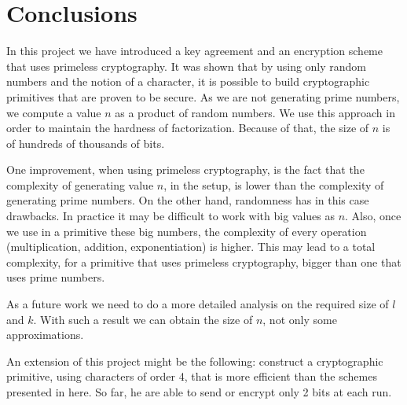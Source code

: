 \documentclass[11pt, a4paper, twoside, openright]{report}
\begin{document}
\clearpage

	\section{Conclusions}
	
		In this project we have introduced a key  agreement and an encryption scheme that uses primeless cryptography. It was shown that by using only random 
		numbers and the notion of a character, it is possible to build cryptographic primitives that are proven to be secure. As we are not generating 
		prime numbers, we compute a value $n$ as a product of random numbers. We use this approach in order to maintain the hardness of factorization. Because
		of that, the size of $n$ is of hundreds of thousands of bits. 
		
		One improvement, when using primeless cryptography, is the fact that the complexity of generating value $n$, in the setup, is lower than the complexity
		of generating prime numbers. On the other hand, randomness has in this case drawbacks. In practice it may be difficult to work with big 
		values as $n$. Also, once we use in a primitive these big numbers, the complexity of every operation (multiplication, addition, exponentiation) 
		is higher. This may lead to a total complexity, for a primitive that uses primeless cryptography, bigger than one that uses 
		prime numbers. 
		
		As a future work we need to do a more detailed analysis on the required size of $l$ and $k$. With such a result we can obtain the  
		size of $n$, not only some approximations.
		
		An extension of this project might be the following: construct a cryptographic primitive, using characters of order 4, that is more efficient than the 
		schemes presented in here. So far, he are able to send or encrypt only 2 bits at each run.
		  
	
	
\clearpage				



	
\end{document}
